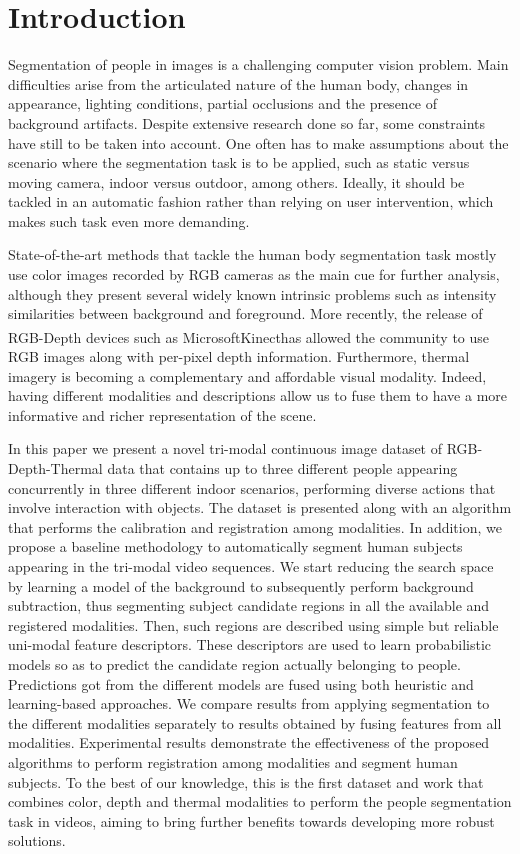 \documentclass[10pt,twocolumn,letterpaper]{article}
\begin{document}
\section{Introduction}
\label{sec:introduction}
Segmentation of people in images is a challenging computer vision problem. Main difficulties arise from the articulated nature of the human body, changes in appearance, lighting conditions, partial occlusions and the presence of background artifacts. Despite extensive research done so far, some constraints have still to be taken into account. One often has to make assumptions about the scenario where the segmentation task is to be applied, such as static versus moving camera, indoor versus outdoor, among others. Ideally, it should be tackled in an automatic fashion rather than relying on user intervention, which makes such task even more demanding. 

State-of-the-art methods that tackle the human body segmentation task mostly use color images recorded by RGB cameras as the main cue for further analysis, although they present several widely known intrinsic problems such as intensity similarities between background and foreground. More recently, the release of RGB-Depth devices such as Microsoft\textsuperscript\textregistered Kinect\textsuperscript\texttrademark has allowed the community to use RGB images along with per-pixel depth information. Furthermore, thermal imagery is becoming a complementary and affordable visual modality. Indeed, having different modalities and descriptions allow us to fuse them to have a more informative and richer representation of the scene. 

In this paper we present a novel tri-modal continuous image dataset of RGB-Depth-Thermal data that contains up to three different people appearing concurrently in three different indoor scenarios, performing diverse actions that involve interaction with objects. The dataset is presented along with an algorithm that performs the calibration and registration among modalities. In addition, we propose a baseline methodology to automatically segment human subjects appearing in the tri-modal video sequences. We start reducing the search space by learning a model of the background to subsequently perform background subtraction, thus segmenting subject candidate regions in all the available and registered modalities. Then, such regions are described using simple but reliable uni-modal feature descriptors. These descriptors are used to learn probabilistic models so as to predict the candidate region actually belonging to people. Predictions got from the different models are fused using both heuristic and learning-based approaches. We compare results from applying segmentation to the different modalities separately to results obtained by fusing features from all modalities. Experimental results demonstrate the effectiveness of the proposed algorithms to perform registration among modalities and segment human subjects. To the best of our knowledge, this is the first dataset and work that combines color, depth and thermal modalities to perform the people segmentation task in videos, aiming to bring further benefits towards developing more robust solutions.
\end{document}

